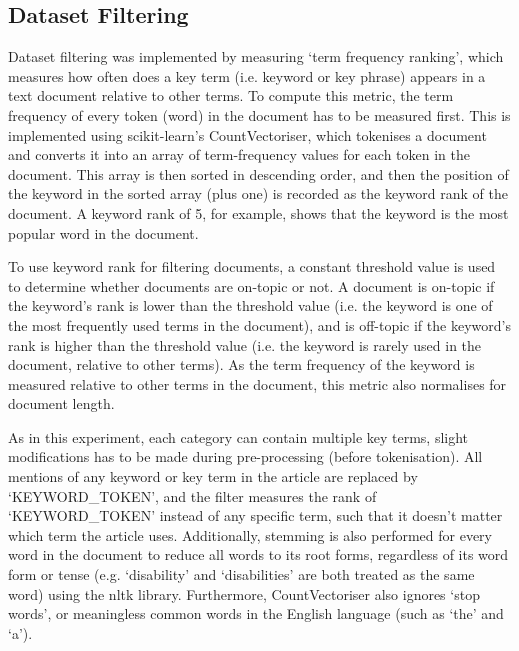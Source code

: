 \documentclass{report}
\begin{document}
\subsection{Dataset Filtering} \label{des-filtering}

Dataset filtering was implemented by measuring `term frequency ranking', which measures how often does a key term (i.e. keyword or key phrase) appears in a text document relative to other terms.
To compute this metric, the term frequency of every token (word) in the document has to be measured first.
This is implemented using scikit-learn's \cite{Scikit-learn} CountVectoriser, which tokenises a document and converts it into an array of term-frequency values for each token in the document.
This array is then sorted in descending order, and then the position of the keyword in the sorted array (plus one) is recorded as the keyword rank of the document.
A keyword rank of 5, for example, shows that the keyword is the  most popular word in the document.

To use keyword rank for filtering documents, a constant threshold value is used to determine whether documents are on-topic or not.
A document is on-topic if the keyword's rank is lower than the threshold value (i.e. the keyword is one of the most frequently used terms in the document), and is off-topic if the keyword's rank is higher than the threshold value (i.e. the keyword is rarely used in the document, relative to other terms).
As the term frequency of the keyword is measured relative to other terms in the document, this metric also normalises for document length.

As in this experiment, each category can contain multiple key terms, slight modifications has to be made during pre-processing (before tokenisation).
All mentions of any keyword or key term in the article are replaced by `KEYWORD\_TOKEN', and the filter measures the rank of `KEYWORD\_TOKEN' instead of any specific term, such that it doesn't matter which term the article uses.
Additionally, stemming is also performed for every word in the document to reduce all words to its root forms, regardless of its word form or tense (e.g. `disability' and `disabilities' are both treated as the same word) using the nltk \cite{Nltk} library.
Furthermore, CountVectoriser also ignores `stop words', or meaningless common words in the English language (such as `the' and `a').
\end{document}
